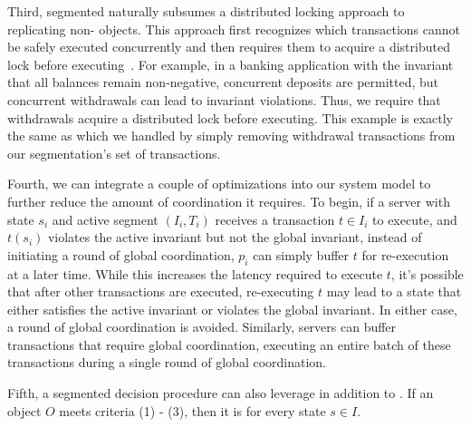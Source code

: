 \begin{techreport}

  Third, segmented \invariantconfluence{} naturally subsumes a distributed
  locking approach to replicating non-\invariantconfluent{} objects. This
  approach first recognizes which transactions cannot be safely executed
  concurrently and then requires them to acquire a distributed lock before
  executing~\cite{balegas2015putting, gotsman2016cause}. For example, in a
  banking application with the invariant that all balances remain non-negative,
  concurrent deposits are permitted, but concurrent withdrawals can lead to
  invariant violations. Thus, we require that withdrawals acquire a distributed
  lock before executing. This example is exactly the same as
   which we handled by simply removing
  withdrawal transactions from our segmentation's set of transactions.

  Fourth, we can integrate a couple of optimizations into our system model to
  further reduce the amount of coordination it requires. To begin, if a server
  with state $s_i$ and active segment $(I_i, T_i)$ receives a transaction $t
  \in I_i$ to execute, and $t(s_i)$ violates the active invariant but not the
  global invariant, instead of initiating a round of global coordination, $p_i$
  can simply buffer $t$ for re-execution at a later time. While this increases
  the latency required to execute $t$, it's possible that after other
  transactions are executed, re-executing $t$ may lead to a state that either
  satisfies the active invariant or violates the global invariant. In either
  case, a round of global coordination is avoided. Similarly, servers can
  buffer transactions that require global coordination, executing an entire
  batch of these transactions during a single round of global coordination.

  Fifth, a segmented \invariantconfluence{} decision procedure can also
  leverage  in addition to
  . If an object $O$ meets
  criteria (1) - (3), then it is  for every state $s \in
  I$.
\end{techreport}

